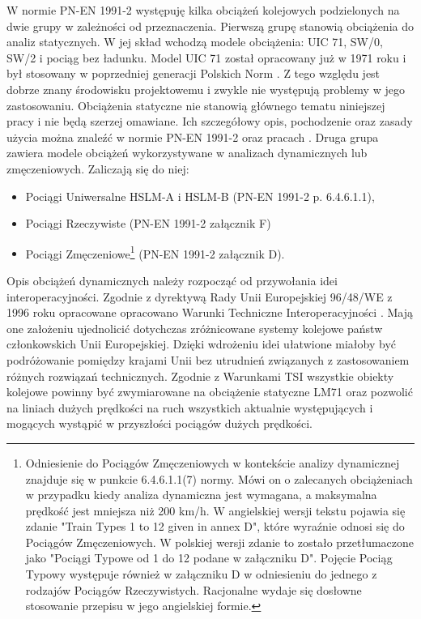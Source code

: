W normie PN-EN 1991-2 występuję kilka obciążeń kolejowych podzielonych na dwie grupy w zależności od przeznaczenia. Pierwszą grupę stanowią obciążenia do analiz statycznych. W jej skład wchodzą modele obciążenia: UIC 71, SW/0, SW/2 i pociąg bez ładunku. Model UIC 71 został opracowany już w 1971 roku \parencite{UnionInternationaleDesCheminsDeFer2006} i był stosowany w poprzedniej generacji Polskich Norm \parencite{PKNe}. Z tego względu jest dobrze znany środowisku projektowemu i zwykle nie występują problemy w jego zastosowaniu. Obciążenia statyczne nie stanowią głównego tematu niniejszej pracy i nie będą szerzej omawiane. Ich szczegółowy opis, pochodzenie oraz zasady użycia można znaleźć w normie PN-EN 1991-2 oraz pracach \parencite{James2003,UnionInternationaleDesCheminsDeFer2006}. Druga grupa zawiera modele obciążeń wykorzystywane w analizach dynamicznych lub zmęczeniowych. Zaliczają się do niej:
\begin{itemize}[noitemsep]
	\item Pociągi Uniwersalne HSLM-A i HSLM-B (PN-EN 1991-2 p. 6.4.6.1.1),
	\item Pociągi Rzeczywiste (PN-EN 1991-2 załącznik F)
	\item Pociągi Zmęczeniowe\footnote{Odniesienie do Pociągów Zmęczeniowych w kontekście analizy dynamicznej znajduje się w punkcie 6.4.6.1.1(7) normy. Mówi on o zalecanych obciążeniach w przypadku kiedy analiza dynamiczna jest wymagana, a maksymalna prędkość jest mniejsza niż 200 km/h. W angielskiej wersji tekstu pojawia się zdanie "Train Types 1 to 12 given in annex D", które wyraźnie odnosi się do Pociągów Zmęczeniowych. W polskiej wersji zdanie to zostało przetłumaczone jako "Pociągi Typowe od 1 do 12 podane w załączniku D". Pojęcie Pociąg Typowy występuje również w załączniku D w odniesieniu do jednego z rodzajów Pociągów Rzeczywistych. Racjonalne wydaje się dosłowne stosowanie przepisu w jego angielskiej formie.} (PN-EN 1991-2 załącznik D). 
\end{itemize}

Opis obciążeń dynamicznych należy rozpocząć od przywołania idei interoperacyjności. Zgodnie z dyrektywą Rady Unii Europejskiej 96/48/WE z 1996 roku opracowane opracowano Warunki Techniczne Interoperacyjności  \parencite{Muncke2008}. Mają one założeniu ujednolicić dotychczas zróżnicowane systemy kolejowe państw członkowskich Unii Europejskiej. Dzięki wdrożeniu idei ułatwione miałoby być podróżowanie pomiędzy krajami Unii bez utrudnień związanych z zastosowaniem różnych rozwiązań technicznych. Zgodnie z Warunkami TSI wszystkie obiekty kolejowe powinny być zwymiarowane na obciążenie statyczne LM71 oraz pozwolić na liniach dużych prędkości na ruch wszystkich aktualnie występujących i mogących wystąpić w przyszłości pociągów dużych prędkości.

